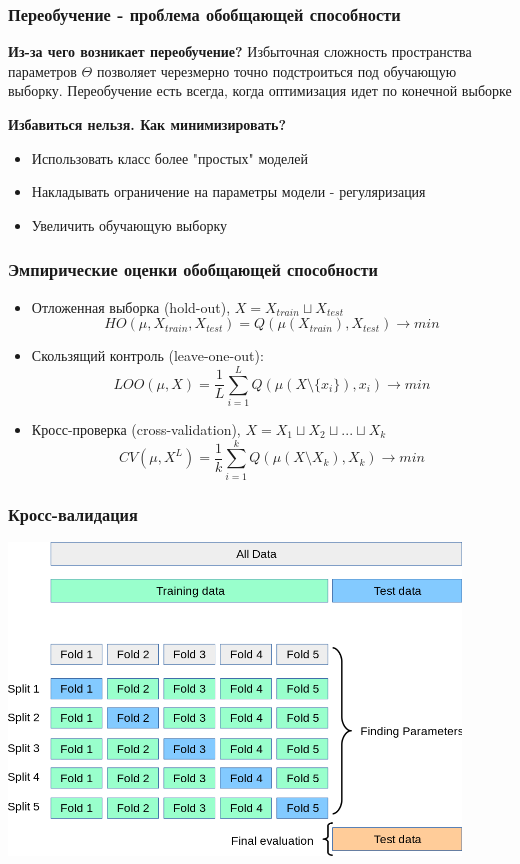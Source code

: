 \documentclass{beamer}
\begin{document}
	\begin{frame}
		\frametitle{Переобучение - проблема обобщающей способности}

			\textbf{Из-за чего возникает переобучение?}
			Избыточная сложность пространства параметров $\Theta$ позволяет черезмерно точно подстроиться под обучающую выборку. Переобучение есть всегда, когда оптимизация идет по конечной выборке
			
			\vspace{15pt}
			
			\textbf{Избавиться нельзя. Как минимизировать?}
			\begin{itemize}
				\item Использовать класс более "простых" моделей
				\item Накладывать ограничение на параметры модели - регуляризация
				\item Увеличить обучающую выборку
			\end{itemize}
	\end{frame}


	\begin{frame}
		\frametitle{Эмпирические оценки обобщающей способности}
		\begin{itemize}
			\item Отложенная выборка (hold-out), $X = X_{train} \sqcup X_{test}$
			$$
			HO(\mu, X_{train}, X_{test}) = Q(\mu(X_{train}), X_{test}) \to min
			$$
			
			\item Скользящий контроль (leave-one-out):
			$$
			LOO(\mu, X) = \frac{1}{L} \sum_{i=1}^{L} Q(\mu(X \setminus \{x_i\}), x_i) \to min
			$$
			
			\item Кросс-проверка (cross-validation), 
			$X = X_1 \sqcup X_2 \sqcup ... \sqcup X_k$
			$$
			CV(\mu, X^{L}) = \frac{1}{k} \sum_{i=1}^{k} Q(\mu(X \setminus X_{k}), X_{k}) \to min
			$$
		\end{itemize}
	\end{frame}
	
	
	\begin{frame}
		\frametitle{Кросс-валидация}
		
		\includegraphics[width=0.9\textwidth]{img/cv.png}
	\end{frame}
	
\end{document}
